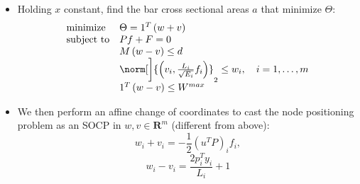 \documentclass[a0]{a0poster}
\begin{document}
\begin{textblock}{7.0}
\begin{itemize}
\item Holding \(x\) constant, find the bar cross sectional areas \(a\) that minimize \(\Theta\):
{\small
  \begin{equation}
    \begin{array}{ll}
      \mbox{minimize}   & \Theta = 1^{T}\left(w+v\right)\\
      \mbox{subject to} & Pf + F = 0\\
                & M\left(w-v\right) \leq d\\
                & \norm[\bigg]{ \left( v_{i},\frac{L_{i}}{\sqrt{E_{i}}}f_{i} \right)}_{2}\leq w_{i},\ \ \ i = 1,\ldots,m \\
                    & 1^{T}\left( w - v \right) \leq W^{max}
    \end{array}
    \label{cvxopt1}
  \end{equation}
}
\item We then perform an affine change of coordinates to cast the node positioning problem as an SOCP in \(w, v\in\mathbf{R}^{m}\) (different from above):
  \[w_{i} + v_{i} = -\frac{1}{2}\left(u^{T}P\right)_{i}f_{i},\]
  \[w_{i} - v_{i} = \frac{2p_{i}^{T}y_{i}}{L_{i}} + 1\]
\end{itemize}
  
\end{textblock}
  
\end{document}
